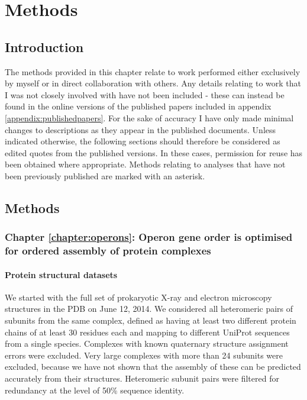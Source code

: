 \documentclass[a4paper,11pt,twoside,openright]{scrbook}
\begin{document}
\chapter{Methods}\label{chapter:methods}

\section{Introduction}
The methods provided in this chapter relate to work performed either exclusively by myself or in direct collaboration with others. Any details relating to work that I was not closely involved with have not been included - these can instead be found in the online versions of the published papers included in appendix \ref{appendix:publishedpapers}. For the sake of accuracy I have only made minimal changes to descriptions as they appear in the published documents. Unless indicated otherwise, the following sections should therefore be considered as edited quotes from the published versions. In these cases, permission for reuse has been obtained where appropriate. Methods relating to analyses that have not been previously published are marked with an asterisk.

\section{Methods}

\subsection{Chapter \ref*{chapter:operons}: Operon gene order is optimised for ordered assembly of protein complexes}

\subsubsection{Protein structural datasets}
We started with the full set of prokaryotic X-ray and electron microscopy structures in the PDB on June 12, 2014. We considered all heteromeric pairs of subunits from the same complex, defined as having at least two different protein chains of at least 30 residues each and mapping to different UniProt sequences from a single species. Complexes with known quaternary structure assignment errors \cite{Levy2007} were excluded. Very large complexes with more than 24 subunits were excluded, because we have not shown that the assembly of these can be predicted accurately from their structures. Heteromeric subunit pairs were filtered for redundancy at the level of 50\% sequence identity.
\end{document}
